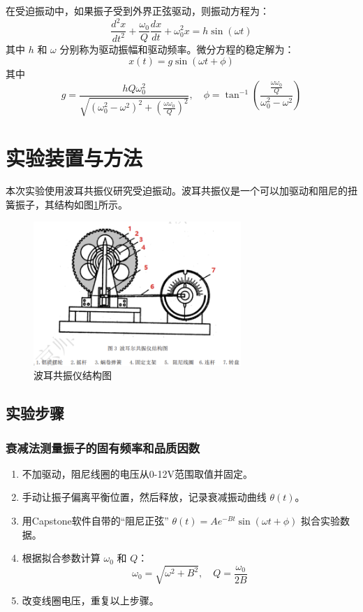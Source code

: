 \documentclass[UTF8]{ctexart}
\begin{document}
在受迫振动中，如果振子受到外界正弦驱动，则振动方程为：
\begin{equation}
\frac{d^2 x}{d t^2} + \frac{\omega_0}{Q} \frac{d x}{d t} + \omega_0^2 x = h \sin(\omega t)
\end{equation}
其中 $h$ 和 $\omega$ 分别称为驱动振幅和驱动频率。微分方程的稳定解为：
\begin{equation}
x(t) = g \sin(\omega t + \phi)
\end{equation}
其中
\begin{equation}
g = \frac{hQ \omega_0^2}{\sqrt{(\omega_0^2 - \omega^2)^2 + (\frac{\omega \omega_0}{Q})^2}}, \quad \phi = \tan^{-1}\left(\frac{\frac{\omega \omega_0}{Q}}{\omega_0^2 - \omega^2}\right)
\end{equation}

\section{实验装置与方法}
本次实验使用波耳共振仪研究受迫振动。波耳共振仪是一个可以加驱动和阻尼的扭簧振子，其结构如图\ref{fig:apparatus}所示。

\begin{figure}[H]
    \centering
    \includegraphics[width=0.7\textwidth]{apparatus.png}
    \caption{波耳共振仪结构图}
    \label{fig:apparatus}
\end{figure}

\subsection{实验步骤}
\subsubsection{衰减法测量振子的固有频率和品质因数}
\begin{enumerate}
    \item 不加驱动，阻尼线圈的电压从0-12V范围取值并固定。
    \item 手动让振子偏离平衡位置，然后释放，记录衰减振动曲线 $\theta(t)$。
    \item 用Capstone软件自带的“阻尼正弦” $\theta(t) = Ae^{-Bt} \sin(\omega t + \phi)$ 拟合实验数据。
    \item 根据拟合参数计算 $\omega_0$ 和 $Q$：
    \begin{equation}
    \omega_0 = \sqrt{\omega^2 + B^2}, \quad Q = \frac{\omega_0}{2B}
    \end{equation}
    \item 改变线圈电压，重复以上步骤。
\end{enumerate}
\end{document}
